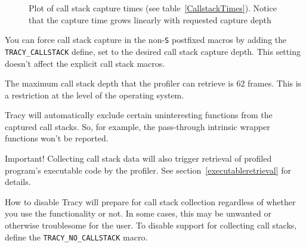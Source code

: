 \documentclass[hidelinks,titlepage,a4paper]{article}
\begin{document}
\begin{figure}[h]
\centering{}
\caption{Plot of call stack capture times (see table~\ref{CallstackTimes}). Notice that the capture time grows linearly with requested capture depth}
\label{CallstackPlot}
\end{figure}

You can force call stack capture in the non-\texttt{S} postfixed macros by adding the \texttt{TRACY\_CALLSTACK} define, set to the desired call stack capture depth. This setting doesn't affect the explicit call stack macros.

The maximum call stack depth that the profiler can retrieve is 62 frames. This is a restriction at the level of the operating system.

Tracy will automatically exclude certain uninteresting functions from the captured call stacks. So, for example, the pass-through intrinsic wrapper functions won't be reported.

\begin{bclogo}[
noborder=true,
couleur=black!5,
logo=\bcbombe
]{Important!}
Collecting call stack data will also trigger retrieval of profiled program's executable code by the profiler. See section~\ref{executableretrieval} for details.
\end{bclogo}

\begin{bclogo}[
noborder=true,
couleur=black!5,
logo=\bclampe
]{How to disable}
Tracy will prepare for call stack collection regardless of whether you use the functionality or not. In some cases, this may be unwanted or otherwise troublesome for the user. To disable support for collecting call stacks, define the \texttt{TRACY\_NO\_CALLSTACK} macro.
\end{bclogo}
\end{document}
